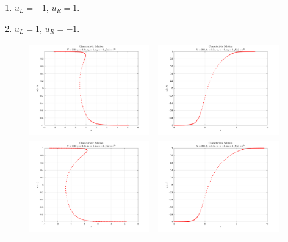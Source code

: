 \documentclass[11pt]{article}
\begin{document}
\begin{enumerate}
\begin{enumerate}
      \begin{enumerate}
        \item $u_L=-1$, $u_R=1$.
        \item $u_L=1$, $u_R=-1$.
      \end{enumerate}
      \begin{figure}[htp]
      	\centering
	\begin{tabular}{cc}
	\includegraphics[width=3.4in]{Q2charac_1.png} & \includegraphics[width=3.4in]{Q2charac_2.png}\\
	\includegraphics[width=3.4in]{Q2charac_3.png} & \includegraphics[width=3.4in]{Q2charac_4.png}\\

\end{tabular}
\end{figure}
\end{enumerate}
\end{enumerate}
\end{document}
